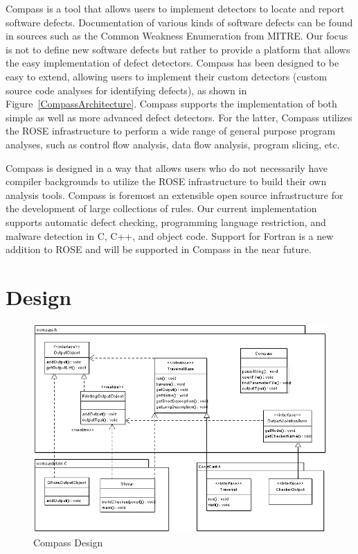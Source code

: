 Compass is a tool that allows users to implement detectors to locate and
report software defects.
Documentation of various kinds of software defects can be found in sources
such as the Common Weakness Enumeration from MITRE. Our focus is not to
define new software defects but
rather to provide a platform that allows the easy implementation of defect
detectors.
Compass has been designed to be easy to extend, allowing users to implement
their custom detectors (custom source code analyses for
identifying defects), as shown in Figure~\ref{CompassArchitecture}. Compass supports
the implementation of both simple as well as more advanced defect
detectors. For the latter, Compass utilizes the ROSE infrastructure to
perform a wide range of general purpose program analyses, such as control
flow analysis, data flow analysis, program slicing, etc.


Compass is designed in a way that allows users who do not necessarily have
compiler backgrounds to utilize the ROSE infrastructure to build their
own analysis tools.
Compass is foremost an extensible open source infrastructure for the
development of large
collections of rules. Our current implementation supports automatic
defect checking, programming language restriction, and malware detection in
C, C++, and object code.
Support for Fortran is a new addition to ROSE and will be supported in
Compass in the near future.




\section{Design}

\begin{figure}[thb]
\includegraphics[width=6.0in]{compassdesign.png}
\caption{Compass Design}
\label{CompassDesign}
\end{figure}

